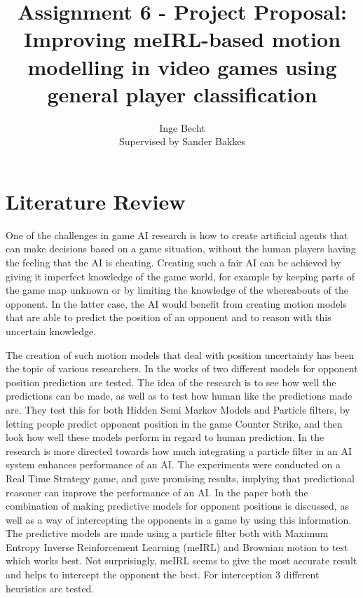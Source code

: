 \documentclass[a4paper, 12pt]{article}
\author{Inge Becht\\
        \small{Supervised by Sander Bakkes}}
\title{Assignment 6 - Project Proposal:\\ 
Improving meIRL-based motion modelling in video
games using general player classification}
\begin{document}
\maketitle

\clearpage
\section{Literature Review}
One of the challenges in game AI research is how to create artificial agents that can make
decisions based on a game situation, without the human players having the
feeling that the AI is cheating. Creating such a fair AI can be achieved by
giving it imperfect knowledge of the game world, for example by keeping parts of
the game map unknown or by limiting the knowledge of the whereabouts of the
opponent. In the latter case, the AI would benefit from creating motion models that
are able to predict the position of an opponent and to
reason with this uncertain knowledge.

The creation of such motion models that deal with position uncertainty  
has been the topic of various researchers. In 
the works of \citep{Hladky_anevaluation} two different models for opponent
position prediction are tested. The idea of the research is to see how well the
predictions can be made, as well as to test how human like the predictions made
are. They test this for both Hidden Semi Markov Models and Particle filters, by
letting people predict opponent position in the game Counter Strike, and then
look how well these models perform in regard to human prediction. 
In \citep{weber2011aiide} the research is more directed towards how much 
integrating a particle filter in an AI system enhances performance of an AI. The
experiments were conducted on a Real Time Strategy game, and gave promising
results, implying that predictional reasoner can improve the performance of an
AI. In the paper \citep{6374144} both the combination of
making predictive models for opponent positions is discussed, as well as a way of
intercepting the opponents in a game by using this information. 
The predictive models are made using a particle filter both with Maximum
Entropy Inverse Reinforcement Learning (meIRL) and Brownian motion to test which works best. Not
surprisingly, meIRL seems to give the most accurate result and helps to intercept
the opponent the best. For interception 3 different heuristics are tested.

\end{document}
